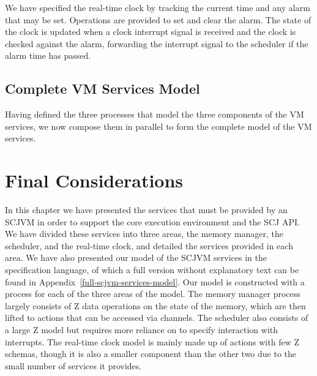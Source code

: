 

We have specified the real-time clock by tracking the current time and
any alarm that may be set.
Operations are provided to set and clear the alarm.
The state of the clock is updated when a clock interrupt signal is
received and the clock is checked against the alarm, forwarding the
interrupt signal to the scheduler if the alarm time has passed.

\subsection{Complete VM Services Model}
\label{scjvm-services-section}

Having defined the three processes that model the three components of
the VM services, we now compose them in parallel to form the complete
model of the VM services.



\section{Final Considerations}

In this chapter we have presented the services that must be provided
by an SCJVM in order to support the core execution environment and the
SCJ API.
We have divided these services into three areas, the memory manager,
the scheduler, and the real-time clock, and detailed the services
provided in each area.
We have also presented our model of the SCJVM services in the
\Circus{} specification language, of which a full version without
explanatory text can be found in
Appendix~\ref{full-scjvm-services-model}.
Our model is constructed with a \Circus{} process for each of the
three areas of the model.
The memory manager process largely consists of Z data operations on
the state of the memory, which are then lifted to \Circus{} actions
that can be accessed via channels.
The scheduler also consists of a large Z model but requires more
reliance on \Circus{} to specify interaction with interrupts.
The real-time clock model is mainly made up of \Circus{} actions with
few Z schemas, though it is also a smaller component than the other
two due to the small number of services it provides.


